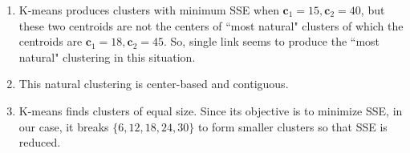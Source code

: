 \documentclass[12pt]{report}
\begin{document}
\begin{enumerate}
\begin{enumerate}
		\item 
		K-means produces clusters with minimum SSE when $\mathbf{c}_1 = 15, \mathbf{c}_2 = 40$, but these two centroids are not the centers of ``most natural" clusters of which the  centroids are $\mathbf{c}_1 = 18, \mathbf{c}_2 = 45$. So, single link seems to produce the ``most natural" clustering in this situation.
		
		\item 
		This natural clustering is center-based and contiguous.
		
		\item 
		K-means finds clusters of equal size. Since its objective is to minimize SSE, in our case, it breaks $\{6, 12, 18, 24, 30\}$ to form smaller clusters so that SSE is reduced.
	\end{enumerate}


\end{enumerate}
\end{document}
